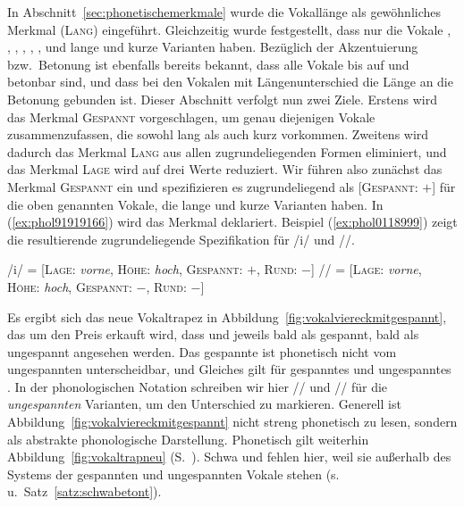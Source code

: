 In Abschnitt~\ref{sec:phonetischemerkmale} wurde die Vokallänge als gewöhnliches Merkmal (\textsc{Lang}) eingeführt.
Gleichzeitig wurde festgestellt, dass nur die Vokale \textipa{[i]}, \textipa{[y]}, \textipa{[u]}, \textipa{[e]}, \textipa{[\o]}, \textipa{[E]}, \textipa{[o]} und \textipa{[a]} lange und kurze Varianten haben.
Bezüglich der Akzentuierung bzw.\ Betonung ist ebenfalls bereits bekannt, dass alle Vokale bis auf \textipa{[@]} und \textipa{[5]} betonbar sind, und dass bei den Vokalen mit Längenunterschied die Länge an die Betonung gebunden ist.
Dieser Abschnitt verfolgt nun zwei Ziele.
Erstens wird das Merkmal \textsc{Gespannt} vorgeschlagen, um genau diejenigen Vokale zusammenzufassen, die sowohl lang als auch kurz vorkommen.
Zweitens wird dadurch das Merkmal \textsc{Lang} aus allen zugrundeliegenden Formen eliminiert, und das Merkmal \textsc{Lage} wird auf drei Werte reduziert.
Wir führen also zunächst das Merkmal \textsc{Gespannt} ein und spezifizieren es zugrundeliegend als [\textsc{Gespannt}: $+$] für die oben genannten Vokale, die lange und kurze Varianten haben.
In (\ref{ex:phol91919166}) wird das Merkmal deklariert.
Beispiel (\ref{ex:phol0118999}) zeigt die resultierende zugrundeliegende Spezifikation für /i/ und //.

\begin{exe}
  \ex\label{ex:phol0118999}
  \begin{xlist}
  	\ex /i/ = [\textsc{Lage}: \textit{vorne}, \textsc{Höhe}: \textit{hoch}, \textsc{Gespannt}: $+$, \textsc{Rund}: $-$]
  	\ex // = [\textsc{Lage}: \textit{vorne}, \textsc{Höhe}: \textit{hoch}, \textsc{Gespannt}: $-$, \textsc{Rund}: $-$]
  \end{xlist}
\end{exe}

Es ergibt sich das neue Vokaltrapez in Abbildung~\ref{fig:vokalviereckmitgespannt}, das um den Preis erkauft wird, dass \textipa{[E]} und \textipa{[a]} jeweils bald als gespannt, bald als ungespannt angesehen werden.
Das gespannte \textipa{[a]} ist phonetisch nicht vom ungespannten \textipa{[a]} unterscheidbar, und Gleiches gilt für gespanntes und ungespanntes \textipa{[E]}.
In der phonologischen Notation schreiben wir hier // und // für die \textit{ungespannten} Varianten, um den Unterschied zu markieren.
Generell ist Abbildung~\ref{fig:vokalviereckmitgespannt} nicht streng phonetisch zu lesen, sondern als abstrakte phonologische Darstellung.
Phonetisch gilt weiterhin Abbildung~\ref{fig:vokaltrapneu} (S.~\pageref{fig:vokaltrapneu}).
Schwa und \textipa{[5]} fehlen hier, weil sie außerhalb des Systems der gespannten und ungespannten Vokale stehen (s.\,u.\ Satz~\ref{satz:schwabetont}).

